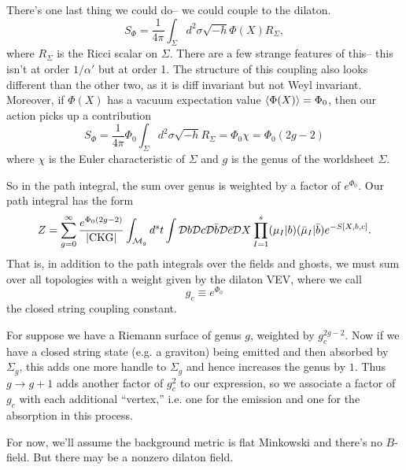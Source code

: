 There's one last thing we could do-- we could couple to the dilaton.
\begin{equation}
    S_\Phi = \frac{1}{4\pi} \int_\Sigma d^2\sigma \sqrt{-h} \Phi(X) R_\Sigma,
\end{equation}
where $R_\Sigma$ is the Ricci scalar on $\Sigma$. There are a few strange features of this-- this isn't at order $1/\alpha'$ but at order 1. The structure of this coupling also looks different than the other two, as it is diff invariant but not Weyl invariant. Moreover, if $\Phi(X)$ has a vacuum expectation value $\left< \Phi(X) \right>=\Phi_0$, then our action picks up a contribution
\begin{equation}
    S_\Phi= \frac{1}{4\pi} \Phi_0 \int_\Sigma d^2\sigma \sqrt{-h} R_\Sigma =\Phi_0 \chi=\Phi_0 (2g-2)
\end{equation}
where $\chi$ is the Euler characteristic of $\Sigma$ and $g$ is the genus of the worldsheet $\Sigma$.

So in the path integral, the sum over genus is weighted by a factor of $e^{\Phi_0}$. Our path integral has the form
\begin{equation}
    Z=\sum_{g=0}^\infty\frac{e^{\Phi_0(2g-2)}}{|\text{CKG}|}\int_{\mathcal{M}_g} d^st \int \mathcal{D} b \mathcal{D} c \mathcal{D} \bar b \mathcal{D} \bar c \mathcal{D} X \prod_{I=1}^s (\mu_I | b)(\bar \mu_I|\bar b) e^{-S[X,b,c]}.
\end{equation}
That is, in addition to the path integrals over the fields and ghosts, we must sum over all topologies with a weight given by the dilaton VEV, where we call
\begin{equation}
    g_c \equiv e^{\Phi_0}
\end{equation}
the closed string coupling constant.

For suppose we have a Riemann surface of genus $g$, weighted by $g_c^{2g-2}$. Now if we have a closed string state (e.g. a graviton) being emitted and then absorbed by $\Sigma_g$, this adds one more handle to $\Sigma_g$ and hence increases the genus by $1$. Thus $g\to g+1$ adds another factor of $g_c^2$ to our expression, so we associate a factor of $g_c$ with each additional ``vertex,'' i.e. one for the emission and one for the absorption in this process.

For now, we'll assume the background metric is flat Minkowski and there's no $B$-field. But there may be a nonzero dilaton field.

